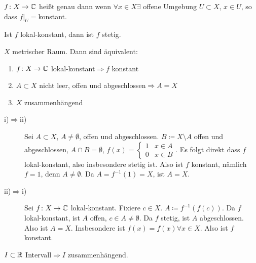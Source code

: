 \begin{definition}
	$ f\colon X\rightarrow\mathbb{C} $ hei\ss t  genau dann wenn $ \forall x\in X\exists $ offene Umgebung $ U\subset X $, $ x\in U $, so dass $ f|_U= $konstant.
\end{definition}
Ist $ f $ lokal-konstant, dann ist $ f $ stetig.\\
\begin{satz}
	$ X $ metrischer Raum. Dann sind \"aquivalent:\begin{enumerate}
		\item $ f\colon X\rightarrow\mathbb{C} $ lokal-konstant$ \Rightarrow f$ konstant
		\item $ A\subset X $ nicht leer, offen und abgeschlossen$ \Rightarrow A=X $
		\item $ X $ zusammenh\"angend
	\end{enumerate}
\end{satz}
\begin{beweis}
	\begin{description}
		\item[i)$ \Rightarrow $ii)] Sei $ A\subset X $, $ A\neq\emptyset $, offen und abgeschlossen. $ B\coloneqq X\setminus A $ offen und abgeschlossen, $ A\cap B=\emptyset $, $ f(x)= \begin{cases}
		1&x\in A\\0&x\in B
		\end{cases} $. Es folgt direkt dass $ f $ lokal-konstant, also insbesondere stetig ist. Also ist $ f $ konstant, n\"amlich $ f=1 $, denn $ A\neq\emptyset $. Da $ A=f^{-1}(1)=X $, ist $ A=X $.
		\item[ii)$ \Rightarrow $i)] Sei $ f\colon X\rightarrow\mathbb{C} $ lokal-konstant. Fixiere $ c\in X $. $ A\coloneqq f^{-1}(f(c)) $. Da $ f $ lokal-konstant, ist $ A $ offen, $ c\in A\neq\emptyset $. Da $ f $ stetig, ist $ A $ abgeschlossen. Also ist $ A=X $. Insbesondere ist $ f(x)=f(x)\forall x\in X $. Also ist $ f $ konstant.
	\end{description}
\end{beweis}
\begin{satz}
	$ I\subset\mathbb{R} $ Intervall$ \Rightarrow I $ zusammenh\"angend.
\end{satz}
\newpage
